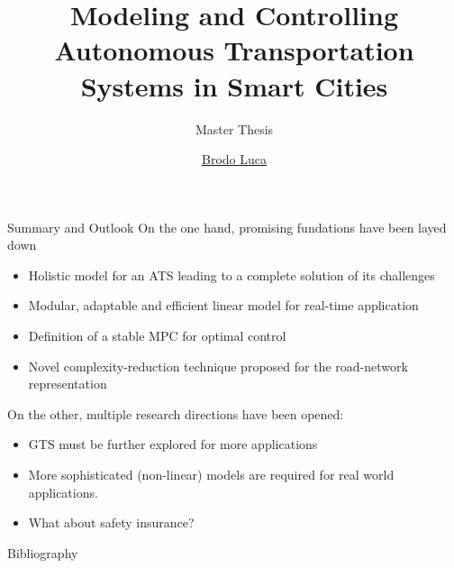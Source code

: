 \documentclass{beamer}
\title{Modeling and Controlling Autonomous Transportation Systems in Smart Cities}
\subtitle{Master Thesis}
\author{
\href{mailto:luca.brodo001@stud.fh-dortmund.de}{Brodo Luca}
}
\begin{document}
\maketitle
\pgfplotsset{compat = 1.3}









\begin{frame}{Summary and Outlook}	
	On the one hand, promising fundations have been layed down
	\vspace{0.15cm}
	\begin{itemize} 
		\item Holistic model for an ATS leading to a complete solution of its challenges
		\item Modular, adaptable and efficient linear model for real-time application
		\item Definition of a stable MPC for optimal control
		\item Novel complexity-reduction technique proposed for the road-network representation
	\end{itemize}
	\vspace{0.15cm}
	On the other, multiple research directions have been opened:
	\vspace{0.15cm}
	\begin{itemize} 
		\item GTS must be further explored for more applications
		\item More sophisticated (non-linear) models are required for real world applications.
		\item What about safety insurance?
	\end{itemize}
	
\end{frame}



\bibbegin
\begin{frame}[allowframebreaks,label=references]{Bibliography}
    
     
\end{frame}


\bibend
\end{document}
